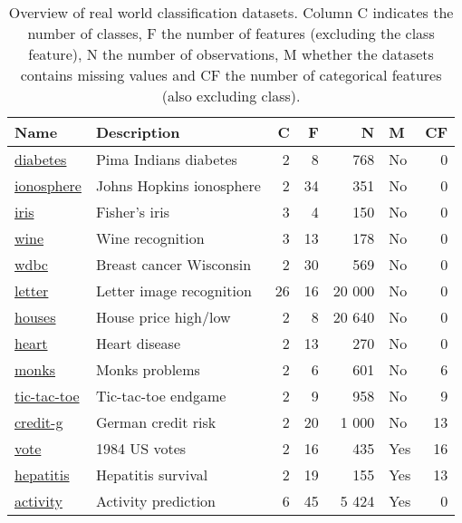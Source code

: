 \begin{table}
\centering
\begin{tabular}[htp]{ l l r r r l r }
    Name & Description & C & F & N & M & CF \\ \hline
    \href{https://www.openml.org/d/37}{diabetes} & Pima Indians diabetes & 2 & 8 & 768 & No & 0 \\
    \href{https://www.openml.org/d/59}{ionosphere} & Johns Hopkins ionosphere & 2 & 34 & 351 & No & 0 \\
    \href{https://www.openml.org/d/61}{iris} & Fisher's iris & 3 & 4 & 150 & No & 0 \\
    \href{https://www.openml.org/d/187}{wine} & Wine recognition & 3 & 13 & 178 & No & 0 \\
    \href{https://www.openml.org/d/1510}{wdbc} & Breast cancer Wisconsin & 2 & 30 & 569 & No & 0 \\
    \href{https://www.openml.org/d/6}{letter} & Letter image recognition & 26 & 16 & 20 000 & No & 0 \\
    \href{https://www.openml.org/d/823}{houses} & House price high/low & 2 & 8 & 20 640 & No & 0 \\
    \href{https://www.openml.org/d/53}{heart} & Heart disease & 2 & 13 & 270 & No & 0 \\
    \href{https://www.openml.org/d/334}{monks} & Monks problems & 2 & 6 & 601 & No & 6 \\
    \href{https://www.openml.org/d/50}{tic-tac-toe} & Tic-tac-toe endgame & 2 & 9 & 958 & No & 9 \\
    \href{https://www.openml.org/d/31}{credit-g} & German credit risk & 2 & 20 & 1 000 & No & 13 \\
    \href{https://www.openml.org/d/56}{vote} & 1984 US votes & 2 & 16 & 435 & Yes & 16 \\
    \href{https://www.openml.org/d/55}{hepatitis} & Hepatitis survival & 2 & 19 & 155 & Yes & 13 \\
    \href{http://www.cis.fordham.edu/wisdm/dataset.php}{activity} & Activity prediction & 6 & 45 & 5 424 & Yes & 0 \\
\end{tabular}
\caption{Overview of real world classification datasets. Column C indicates the number of classes, F the number of features (excluding the class feature), N the number of observations, M whether the datasets contains missing values and CF the number of categorical features (also excluding class).}%
\label{tbl:datasets}
\end{table}

